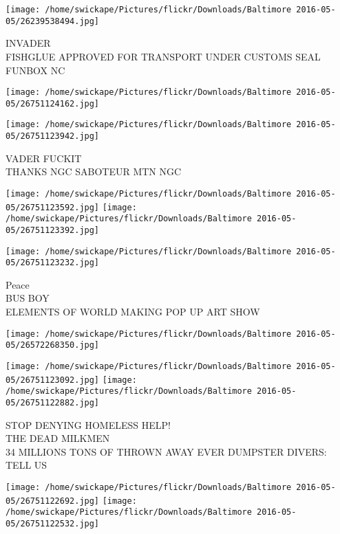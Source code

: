 \documentclass[10pt,letterpaper]{article}
\begin{document}
\texttt{[image: /home/swickape/Pictures/flickr/Downloads/Baltimore 2016-05-05/26239538494.jpg]}

INVADER\\
FISHGLUE APPROVED FOR TRANSPORT UNDER CUSTOMS SEAL\\
FUNBOX NC\\
\pagebreak

\texttt{[image: /home/swickape/Pictures/flickr/Downloads/Baltimore 2016-05-05/26751124162.jpg]}

\vspace{0.25in}
\texttt{[image: /home/swickape/Pictures/flickr/Downloads/Baltimore 2016-05-05/26751123942.jpg]}

VADER FUCKIT\\
THANKS NGC SABOTEUR MTN NGC\\
\pagebreak

\texttt{[image: /home/swickape/Pictures/flickr/Downloads/Baltimore 2016-05-05/26751123592.jpg]}
\texttt{[image: /home/swickape/Pictures/flickr/Downloads/Baltimore 2016-05-05/26751123392.jpg]}

\texttt{[image: /home/swickape/Pictures/flickr/Downloads/Baltimore 2016-05-05/26751123232.jpg]}

Peace\\
BUS BOY\\
ELEMENTS OF WORLD MAKING POP UP ART SHOW\\
\pagebreak

\texttt{[image: /home/swickape/Pictures/flickr/Downloads/Baltimore 2016-05-05/26572268350.jpg]}

\vspace{0.25in}
\texttt{[image: /home/swickape/Pictures/flickr/Downloads/Baltimore 2016-05-05/26751123092.jpg]}
\texttt{[image: /home/swickape/Pictures/flickr/Downloads/Baltimore 2016-05-05/26751122882.jpg]}

STOP DENYING HOMELESS HELP!\\
THE DEAD MILKMEN\\
34 MILLIONS TONS OF THROWN AWAY EVER DUMPSTER DIVERS: TELL US\\
\pagebreak

\texttt{[image: /home/swickape/Pictures/flickr/Downloads/Baltimore 2016-05-05/26751122692.jpg]}
\texttt{[image: /home/swickape/Pictures/flickr/Downloads/Baltimore 2016-05-05/26751122532.jpg]}
\end{document}
